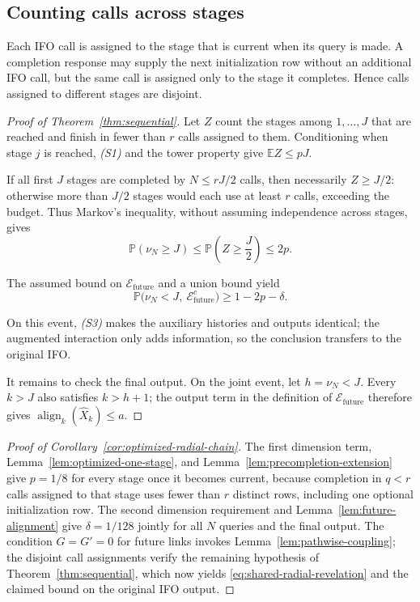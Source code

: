 \documentclass{article}
\newcommand{\E}{\mathbb{E}}
\theoremstyle{definition}
\newcommand{\Prob}{\mathbb{P}}
\newcommand{\cEfuture}{\mathcal{E}_{\mathrm{future}}}
\begin{document}
\subsection{Counting calls across stages}

Each IFO call is assigned to the stage that is current when its query is made.  A
completion response may supply the next initialization row without an
additional IFO call, but the same call is assigned only to the stage it
completes.  Hence calls assigned to
different stages are disjoint.

\begin{proof}[Proof of Theorem~\ref{thm:sequential}]
Let $Z$ count the stages among $1,\ldots,J$ that are reached and finish in
fewer than $r$ calls assigned to them.  Conditioning when stage $j$ is reached,
\emph{(S1)} and the tower property give $\E Z\le pJ$.

If all first $J$ stages are completed by $N\le rJ/2$ calls, then
necessarily $Z\ge J/2$: otherwise more than $J/2$ stages would each use at
least $r$ calls, exceeding the budget.  Thus Markov's inequality, without
assuming independence across stages, gives
\begin{equation}
\Prob(\nu_N\ge J)
\le\Prob\!\left(Z\ge\frac J2\right)
\le2p.
\end{equation}

The assumed bound on $\cEfuture$ and a union bound yield
\begin{equation}
 \Prob\bigl(\nu_N<J,\ \cEfuture^c\bigr)
 \ge1-2p-\delta.
\end{equation}

On this event, \emph{(S3)} makes the auxiliary histories and outputs
identical; the augmented interaction only adds information, so the conclusion
transfers to the original IFO.

It remains to check the final output.  On the joint event, let $h=\nu_N<J$.
Every $k>J$ also satisfies $k>h+1$;
the output term in the definition of $\cEfuture$ therefore gives
$\operatorname{align}_k(\widehat X_k)\le a$.
\end{proof}

\begin{proof}[Proof of Corollary~\ref{cor:optimized-radial-chain}]
The first dimension term, Lemma~\ref{lem:optimized-one-stage}, and
Lemma~\ref{lem:precompletion-extension} give $p=1/8$ for every stage once it
becomes current,
because completion in $q<r$ calls assigned to that stage uses fewer than $r$
distinct rows, including one optional initialization row.  The second dimension requirement
and Lemma~\ref{lem:future-alignment} give $\delta=1/128$ jointly for all $N$
queries and the final output.  The condition $G=G'=0$ for future links invokes
Lemma~\ref{lem:pathwise-coupling}; the disjoint call assignments verify the
remaining hypothesis of Theorem~\ref{thm:sequential}, which now yields
\eqref{eq:shared-radial-revelation} and the claimed bound on the original IFO
output.
\end{proof}
\end{document}
